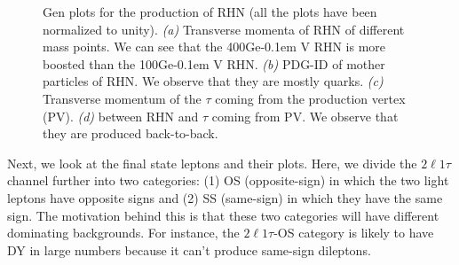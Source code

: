 \documentclass[letterpaper,12pt]{article}
\newcommand{\GeV}{{Ge\kern -0.1em V}}
\begin{document}
\begin{figure}[h]
%
\qquad
{}%
\caption{Gen plots for the production of RHN (all the plots have been normalized to unity). \emph{(a)} Transverse momenta of RHN of different mass points. We can see that the 400\GeV{} RHN is more boosted than the 100\GeV{} RHN. \emph{(b)} PDG-ID of mother particles of RHN. We observe that they are mostly quarks. \emph{(c)} Transverse momentum of the $\tau$ coming from the production vertex (PV). \emph{(d)} \DeltaR{} between RHN and $\tau$ coming from PV. We observe that they are produced back-to-back.}

\label{fig:gen}  
\end{figure}
\clearpage

Next, we look at the final state leptons and their plots. Here, we divide the $2\ell1\tau$ channel further into two categories: (1) OS (opposite-sign) in which the two light leptons have opposite signs and (2) SS (same-sign) in which they have the same sign. The motivation behind this is that these two categories will have different dominating backgrounds. For instance, the $2\ell1\tau$-OS category is likely to have DY in large numbers because it can't produce same-sign dileptons.
\end{document}
